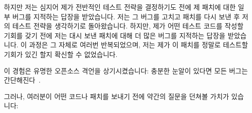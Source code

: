 하지만 저는 심지어 제가 전반적인 테스트 전략을 결정하기도 전에 제 패치에 대한
일부 버그를 지적하는 답장을 받았습니다.
저는 그 버그를 고치고 패치를 다시 보낸 후 저의 테스트 전략을 생각하기로
돌아왔습니다.
하지만, 제가 어떤 테스트 코드를 작성할 기회를 갖기 전에 저는 대시 보낸 패치에
대해 더 많은 버그를 지적하는 답장을 받았습니다.
이 과정은 그 자체로 여러번 반복되었으며, 저는 제가 이 패치를 정말로 테스트할
기회가 있긴 할지 확신할 수 없었습니다.

이 경험은 유명한 오픈소스 격언을 상기시켰습니다:
충분한 눈알이 있다면 모든 버그는 간단해진다~\cite{EricSRaymond99b}.

그러나, 여러분이 어떤 코드나 패치를 보내기 전에 약간의 질문을 던쳐볼 가치가
있습니다:

